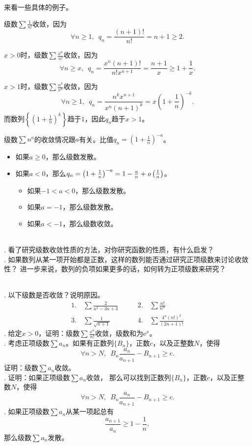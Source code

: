 \documentclass[12pt,UTF8,fontset=none]{ctexbook}
\begin{document}
来看一些具体的例子。

级数$\sum \frac{1}{n!}$收敛，因为
$$\forall n \geqslant 1,  \,\,\,q_n = \frac{(n+1)!}{n!} = n+1 \geqslant 2. $$

$x>0$时，级数$\sum \frac{x^n}{n!}$收敛，因为
$$\forall n \geqslant x,  \,\,\,q_n = \frac{x^n (n+1)!}{n! x^{n+1}} = \frac{n+1}{x} \geqslant 1 + \frac{1}{x}. $$

$x>1$时，级数$\sum \frac{n^k}{x^n}$收敛，因为
$$\forall n \geqslant 1,  \,\,\,q_n = \frac{n^k x^{n+1}}{x^n (n+1)^{k}} = x\left(1 + \frac{1}{n}\right)^{-k}. $$
而数列$\left\{\left(1 + \frac{1}{n}\right)^k\right\}$趋于$1$，因此$q_n$趋于$x>1$。

级数$\sum n^a$的收敛情况跟$a$有关。比值$q_n = \left(1 + \frac{1}{n}\right)^{-a}$。
\begin{itemize}
    \item 如果$a\geqslant 0$，那么级数发散。
    \item 如果$a<0$，那么$q_n = \left(1 + \frac{1}{n}\right)^{-a} = 1 - \frac{a}{n} + \mathit{o}\left(\frac{1}{n}\right)$。
    \begin{itemize}
        \item 如果$-1 < a < 0$，那么级数发散。
        \item 如果$a = -1$，那么级数发散。
        \item 如果$a < -1$，那么级数收敛。
    \end{itemize}
\end{itemize}

\begin{sk}
    \mbox{} \\
    . 看了研究级数收敛性质的方法，对你研究函数的性质，有什么启发？\\
    . 如果数列从某一项开始都是正数，这样的数列能否通过研究正项级数来讨论收敛性？
    进一步来说，数列的负项如果更多的话，如何转为正项级数来研究？
\end{sk}

\begin{xt}
    \mbox{} \\
    . 以下级数是否收敛？说明原因。
    $$
    \begin{array}{ll}
        1. \quad \sum \frac{2}{n^2 - 3n + 3} \qquad &2. \quad \sum \frac{n!}{n^n} \\
        3. \quad \sum \frac{1}{\sqrt{n + 1}} \qquad &4. \quad \sum \frac{4^n (n!)^2}{(2n + 1)!} 
    \end{array}
    $$
    . 给定$x>0$，证明：级数$\sum \frac{x^n}{n!}$收敛，级数和为$\mathrm{e}^x$。\\
    . 考虑正项级数$\sum a_n$。如果有正数列$\{B_n\}$，正数$c$，以及正整数$N$，使得
    $$ \forall n > N, \,\,\, B_n \frac{a_n}{a_{n+1}} - B_{n+1} \geqslant c. $$
    证明：级数$\sum a_n$收敛。\\
    . 证明：如果正项级数$\sum a_n$收敛，
    那么可以找到正数列$\{B_n\}$，正数$c$，以及正整数$N$，使得
    $$ \forall n > N, \,\,\, B_n \frac{a_n}{a_{n+1}} - B_{n+1} \geqslant c. $$
    . 如果正项级数$\sum a_n$从某一项起总有
    $$ \frac{a_{n+1}}{a_n} \geqslant 1 - \frac{1}{n},$$
    那么级数$\sum a_n$发散。\\

\end{xt}
\end{document}
